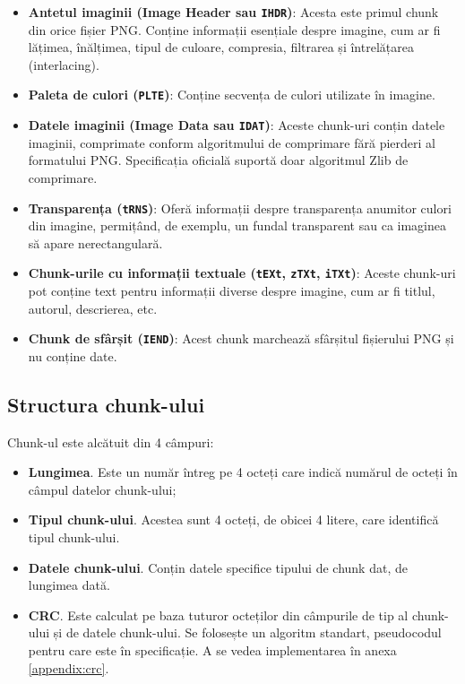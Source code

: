 \documentclass[a4paper,12pt]{report}
\begin{document}
\begin{itemize}
  \item
      \textbf{Antetul imaginii (Image Header sau \texttt{IHDR})}:
      Acesta este primul chunk din orice fișier \ac{PNG}.
      Conține informații esențiale despre imagine, cum ar fi lățimea,
      înălțimea, tipul de culoare, compresia, filtrarea și întrelățarea (interlacing).

  \item
      \textbf{Paleta de culori (\texttt{PLTE})}:
      Conține secvența de culori utilizate în imagine.

  \item
      \textbf{Datele imaginii (Image Data sau \texttt{IDAT})}:
      Aceste chunk-uri conțin datele imaginii,
      comprimate conform algoritmului de comprimare fără pierderi al formatului \ac{PNG}.
      Specificația oficială suportă doar algoritmul Zlib de comprimare.

  \item
      \textbf{Transparența (\texttt{tRNS})}:
      Oferă informații despre transparența anumitor culori din imagine,
      permițând, de exemplu, un fundal transparent sau ca imaginea să apare nerectangulară.

  \item
      \textbf{Chunk-urile cu informații textuale (\texttt{tEXt}, \texttt{zTXt}, \texttt{iTXt})}:
      Aceste chunk-uri pot conține text pentru informații diverse despre imagine,
        cum ar fi titlul, autorul, descrierea, etc.

  \item
      \textbf{Chunk de sfârșit (\texttt{IEND})}:
      Acest chunk marchează sfârșitul fișierului \ac{PNG} și nu conține date.
\end{itemize}

\subsection{Structura chunk-ului}

Chunk-ul este alcătuit din 4 câmpuri:
\begin{itemize}
    \item \textbf{Lungimea}. Este un număr întreg pe 4 octeți care indică numărul de octeți în câmpul datelor chunk-ului;
    \item \textbf{Tipul chunk-ului}. Acestea sunt 4 octeți, de obicei 4 litere, care identifică tipul chunk-ului.
    \item \textbf{Datele chunk-ului}. Conțin datele specifice tipului de chunk dat, de lungimea dată.
    \item \textbf{\ac{CRC}}.
        Este calculat pe baza tuturor octeților din câmpurile de tip al chunk-ului și de datele chunk-ului. 
        Se folosește un algoritm standart, pseudocodul pentru care este în specificație.
        A se vedea implementarea în anexa \ref{appendix:crc}.
\end{itemize}
\end{document}
